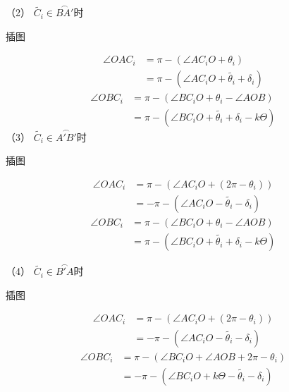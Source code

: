 \documentclass[UTF8]{ctexart}
\begin{document}
（2） $ \tilde{C_i}\in\overset{\frown}{BA'} $时

插图

\begin{align*}
    \angle OAC_i & =\pi - (\angle AC_iO + \theta_i)                  \\
                 & =\pi - (\angle AC_iO + \tilde{\theta_i}+\delta_i)
\end{align*}
\begin{align*}
    \angle OBC_i & =\pi - (\angle BC_iO + \theta_i - \angle AOB )                \\
                 & = \pi - (\angle BC_iO + \tilde{\theta_i}+\delta_i - k\Theta )
\end{align*}
（3） $ \tilde{C_i}\in\overset{\frown}{A'B'} $时

插图

\begin{align*}
    \angle OAC_i & =\pi - (\angle AC_iO + (2\pi -\theta_i))           \\
                 & =-\pi - (\angle AC_iO - \tilde{\theta_i}-\delta_i)
\end{align*}
\begin{align*}
    \angle OBC_i & =\pi - (\angle BC_iO + \theta_i - \angle AOB )                \\
                 & = \pi - (\angle BC_iO + \tilde{\theta_i}+\delta_i - k\Theta )
\end{align*}

（4） $ \tilde{C_i}\in\overset{\frown}{B'A} $时

插图

\begin{align*}
    \angle OAC_i & =\pi - (\angle AC_iO + (2\pi-\theta_i ))           \\
                 & =-\pi - (\angle AC_iO - \tilde{\theta_i}-\delta_i)
\end{align*}
\begin{align*}
    \angle OBC_i & =\pi - (\angle BC_iO + \angle AOB +2\pi - \theta_i) \\        & = -\pi - (\angle BC_iO + k\Theta - \tilde{\theta_i}-\delta_i)
\end{align*}
\end{document}
